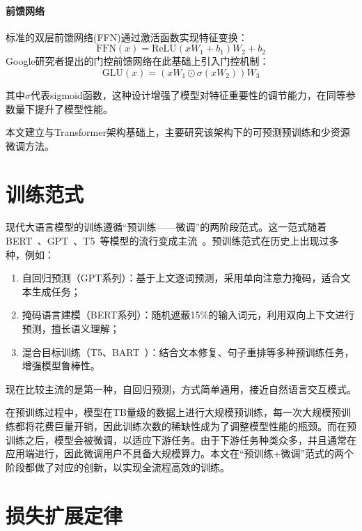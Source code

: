 \paragraph{前馈网络}
标准的双层前馈网络(FFN)通过激活函数实现特征变换：
\begin{equation}
    \text{FFN}(x) = \text{ReLU}(xW_1 + b_1)W_2 + b_2
\end{equation}
Google研究者提出的门控前馈网络在此基础上引入门控机制：
\begin{equation}
    \text{GLU}(x) = (xW_1 \odot \sigma(xW_2))W_3
\end{equation}

其中$\sigma$代表sigmoid函数，这种设计增强了模型对特征重要性的调节能力，在同等参数量下提升了模型性能。

本文建立与Transformer架构基础上，主要研究该架构下的可预测预训练和少资源微调方法。

\section{训练范式}
现代大语言模型的训练遵循“预训练——微调”的两阶段范式。这一范式随着BERT~\cite{devlin2018bert}、GPT~\cite{radford2018improving}、T5~\cite{raffel2020exploring}等模型的流行变成主流~\cite{xu2021pre}。预训练范式在历史上出现过多种，例如：
\begin{enumerate}
    \item 自回归预测（GPT系列）：基于上文逐词预测，采用单向注意力掩码，适合文本生成任务；
    \item 掩码语言建模（BERT系列）：随机遮蔽15\%的输入词元，利用双向上下文进行预测，擅长语义理解；
    \item 混合目标训练（T5、BART~\cite{lewis2019bart}）：结合文本修复、句子重排等多种预训练任务，增强模型鲁棒性。
\end{enumerate}
现在比较主流的是第一种，自回归预测，方式简单通用，接近自然语言交互模式。

在预训练过程中，模型在TB量级的数据上进行大规模预训练，每一次大规模预训练都将花费巨量开销，因此训练次数的稀缺性成为了调整模型性能的瓶颈。而在预训练之后，模型会被微调，以适应下游任务。由于下游任务种类众多，并且通常在应用端进行，因此微调用户不具备大规模算力。本文在“预训练+微调”范式的两个阶段都做了对应的创新，以实现全流程高效的训练。

\section{损失扩展定律}

